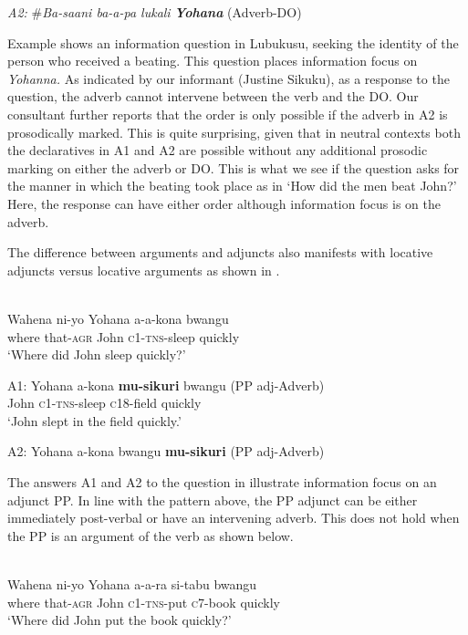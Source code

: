 \documentclass[output=paper]{langsci/langscibook}
\begin{document}
\glt \textit{A2:}  \#\textit{Ba-saani  ba-a-pa  lukali}    \textbf{\textit{Yohana}}  (Adverb-DO)  
\z


Example  shows an information question in Lubukusu, seeking the identity of the person who received a beating. This question places information focus on \textit{Yohanna.} As indicated by our informant (Justine Sikuku), as a response to the question, the adverb cannot intervene between the verb and the DO. Our consultant further reports that the order is only possible if the adverb in A2 is prosodically marked. This is quite surprising, given that in neutral contexts both the declaratives in A1 and A2 are possible without any additional prosodic marking on either the adverb or DO. This is what we see if the question asks for the manner in which the beating took place as in ‘How did the men beat John?’ Here, the response can have either order although information focus is on the adverb. 

  The difference between arguments and adjuncts also manifests with locative adjuncts versus locative arguments as shown in .  


\ea\label{ex:}
  \\
\gll Wahena  ni-yo    Yohana  a-a-kona  bwangu \\
where     that-\textsc{agr}   John     \textsc{c1-tns}-sleep  quickly \\
\glt ‘Where did John sleep quickly?’ \\
\z

\ea\label{ex:}
\gll A1:  {Yohana  a-kona}    \textbf{{mu-sikuri}}{   bwangu}  (PP adj-Adverb) \\
       John     \textsc{c1-tns}-sleep  \textsc{c}18-field   quickly   \\
\glt   ‘John slept in the field quickly.’

 A2:  Yohana  a-kona    bwangu  \textbf{mu-sikuri}  (PP adj-Adverb)\\
\z


The answers A1 and A2 to the question in  illustrate information focus on an adjunct PP. In line with the pattern above, the PP adjunct can be either immediately post-verbal or have an intervening adverb. This does not hold when the PP is an argument of the verb as shown below.  


\ea\label{ex:}
\\
\gll Wahena  ni-yo    Yohana   a-a-ra     si-tabu          bwangu \\
where     that-\textsc{agr}   John     \textsc{c1-tns}-put   \textsc{c}7-book       quickly \\
\glt ‘Where did John put the book quickly?’  
\z
\end{document}
